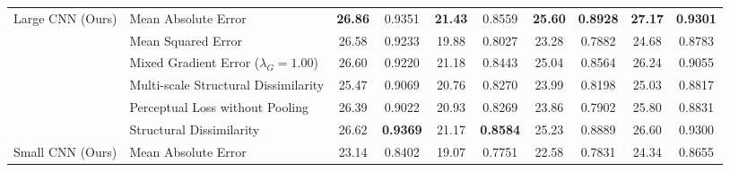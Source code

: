 \begin{table*}[tbh]
\begin{tabular}{ll cc cc cc cc}
        \midrule
        \multirow{6}{*}{Large CNN (Ours)}  & Mean Absolute Error                       & \textbf{26.86}                           & 0.9351                               & \textbf{21.43}                            & 0.8559                                        & \textbf{25.60} & \textbf{0.8928} & \textbf{27.17} & \textbf{0.9301} \\
                                           & Mean Squared Error                        & 26.58                                    & 0.9233                               & 19.88                                     & 0.8027                                        & 23.28          & 0.7882          & 24.68          & 0.8783          \\
                                           & Mixed Gradient Error ($\lambda_G = 1.00$) & 26.60                                    & 0.9220                               & 21.18                                     & 0.8443                                        & 25.04          & 0.8564          & 26.24          & 0.9055          \\
                                           & Multi-scale Structural Dissimilarity      & 25.47                                    & 0.9069                               & 20.76                                     & 0.8270                                        & 23.99          & 0.8198          & 25.03          & 0.8817          \\
                                           & Perceptual Loss without Pooling           & 26.39                                    & 0.9022                               & 20.93                                     & 0.8269                                        & 23.86          & 0.7902          & 25.80          & 0.8831          \\
                                           & Structural Dissimilarity                  & 26.62                                    & \textbf{0.9369}                      & 21.17                                     & \textbf{0.8584}                               & 25.23          & 0.8889          & 26.60          & 0.9300          \\
        \midrule
        \multirow{10}{*}{Small CNN (Ours)} & Mean Absolute Error                       & 23.14                                    & 0.8402                               & 19.07                                     & 0.7751                                        & 22.58          & 0.7831          & 24.34          & 0.8655          \\

\end{tabular}
\end{table*}
